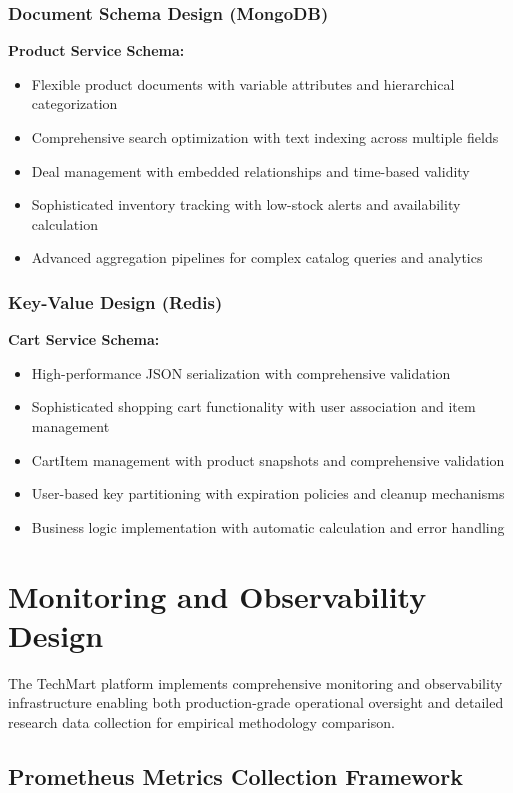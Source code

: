 \subsubsection{Document Schema Design (MongoDB)}

\textbf{Product Service Schema:}
\begin{itemize}
\item Flexible product documents with variable attributes and hierarchical categorization
\item Comprehensive search optimization with text indexing across multiple fields
\item Deal management with embedded relationships and time-based validity
\item Sophisticated inventory tracking with low-stock alerts and availability calculation
\item Advanced aggregation pipelines for complex catalog queries and analytics
\end{itemize}

\subsubsection{Key-Value Design (Redis)}

\textbf{Cart Service Schema:}
\begin{itemize}
\item High-performance JSON serialization with comprehensive validation
\item Sophisticated shopping cart functionality with user association and item management
\item CartItem management with product snapshots and comprehensive validation
\item User-based key partitioning with expiration policies and cleanup mechanisms
\item Business logic implementation with automatic calculation and error handling
\end{itemize}

\section{Monitoring and Observability Design}

The TechMart platform implements comprehensive monitoring and observability infrastructure enabling both production-grade operational oversight and detailed research data collection for empirical methodology comparison.

\subsection{Prometheus Metrics Collection Framework}

